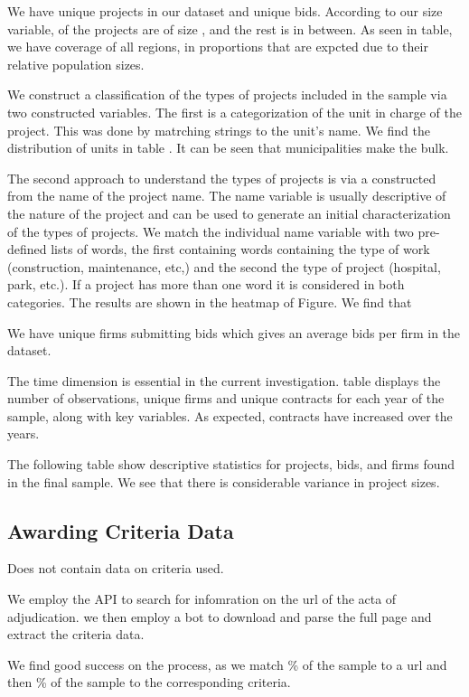 We have unique projects in our dataset and unique bids. According to our size variable, of the projects are of size , and the rest is in between. As seen in table, we have coverage of all regions, in proportions that are expcted due to their relative population sizes.

We construct a classification of the types of projects included in the sample via two constructed variables. The first is a categorization of the unit in charge of the project. This was done by matrching strings to the unit's name. We find the distribution of units in table . It can be seen that municipalities make the bulk.

The second approach to understand the types of projects is via a constructed from the name of the project name. The name variable is usually descriptive of the nature of the project and can be used to generate an initial characterization of the types of projects. We match the individual name variable with two pre-defined lists of words, the first containing words containing the type of work (construction, maintenance, etc,) and the second the type of project (hospital, park, etc.). If a project has more than one word it is considered in both categories. The results are shown in the heatmap of Figure. We find that

We have unique firms submitting bids which gives an average bids per firm in the dataset.

The time dimension is essential in the current investigation. table displays the number of observations, unique firms and unique contracts for each year of the sample, along with key variables. As expected, contracts have increased over the years.

The following table show descriptive statistics for projects, bids, and firms found in the final sample. We see that there is considerable variance in project sizes.

\subsection{Awarding Criteria Data}

Does not contain data on criteria used.

We employ the API to search for infomration on the url of the acta of adjudication. we then employ a bot to download and parse the full page and extract the criteria data.

We find good success on the process, as we match \% of the sample to a url and then \% of the sample to the corresponding criteria.

